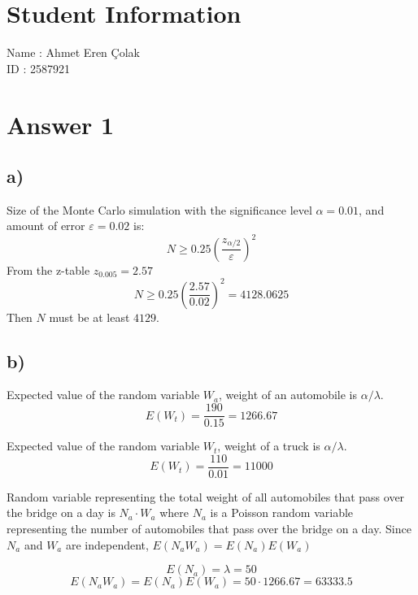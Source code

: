 \documentclass[12pt]{article}
\begin{document}
\section*{Student Information}

Name : Ahmet Eren Çolak\\

ID : 2587921\\

\section*{Answer 1}
\subsection*{a)}
Size of the Monte Carlo simulation with the significance level $\alpha=0.01$, and amount of error $\varepsilon = 0.02$ is:
\begin{equation*}
	N \geq 0.25 \left(\frac{z_{\alpha/2}}{\varepsilon} \right)^2
\end{equation*}
From the z-table $z_{0.005} = 2.57$
\begin{equation*}
	N \geq 0.25 \left(\frac{2.57}{0.02} \right)^2 = 4128.0625
\end{equation*}
Then $N$ must be at least $4129$.
\subsection*{b)}
Expected value of the random variable $W_a$, weight of an automobile is $\alpha / \lambda$.
\begin{equation*}
	E(W_t) = \frac{190}{0.15} = 1266.67
\end{equation*}

Expected value of the random variable $W_t$, weight of a truck is $\alpha / \lambda$.
\begin{equation*}
	E(W_t) = \frac{110}{0.01} = 11000
\end{equation*}

Random variable representing the total weight of all automobiles that pass over the bridge on a day is $N_a \cdot W_a$ where $N_a$ is a Poisson random variable representing the number of automobiles that pass over the bridge on a day. Since $N_a$ and $W_a$ are independent, $E(N_aW_a) = E(N_a)E(W_a)$

\begin{equation*}
	E(N_a) = \lambda = 50
\end{equation*}
\begin{equation*}
	E(N_aW_a) = E(N_a)E(W_a)=50 \cdot 1266.67 = 63333.5
\end{equation*}
\end{document}
